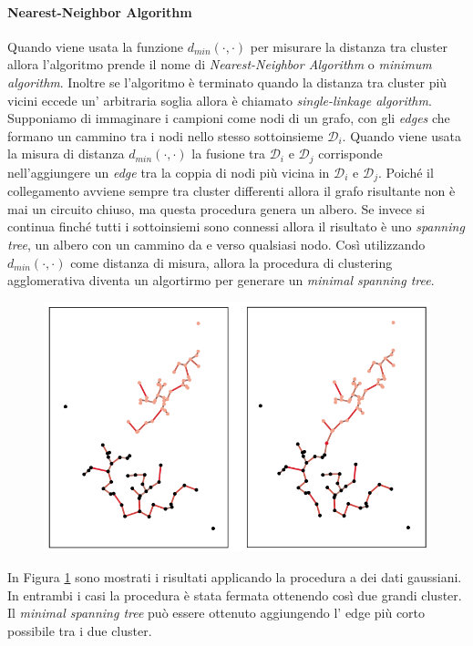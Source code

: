 \paragraph{Nearest-Neighbor Algorithm}
Quando viene usata la funzione $d_{min}(\cdot, \cdot)$ per misurare la distanza tra cluster allora l'algoritmo prende il nome di \emph{Nearest-Neighbor Algorithm} o \emph{minimum algorithm}. Inoltre se l'algoritmo è terminato quando la distanza tra  cluster più vicini eccede un' arbitraria soglia allora è chiamato \emph{single-linkage algorithm}. Supponiamo di immaginare i campioni come nodi di un grafo, con gli \emph{edges} che formano un cammino tra i nodi nello stesso sottoinsieme $\mathcal{D}_i$. Quando viene usata la misura di distanza $d_{min}(\cdot, \cdot)$ la fusione tra $	\mathcal{D}_i$ e $	\mathcal{D}_j$ corrisponde nell'aggiungere un \emph{edge} tra la coppia di nodi più vicina in  $	\mathcal{D}_i$ e $	\mathcal{D}_j$. Poiché il collegamento  avviene sempre tra cluster differenti allora il grafo risultante non è mai un circuito chiuso, ma questa procedura genera un albero. Se invece si continua finché tutti i sottoinsiemi sono connessi allora il risultato è uno \emph{spanning tree}, un albero con un cammino da e verso qualsiasi nodo. Così utilizzando $d_{min}(\cdot, \cdot)$ come distanza di misura, allora la procedura di clustering agglomerativa diventa un algortirmo per generare un \emph{minimal spanning tree}.   
\begin{figure}
\centering
\includegraphics[scale=0.5]{img/spanningtree.png}
\caption{}
\label{spanning}
\end{figure}
In Figura \ref{spanning} sono mostrati i risultati applicando la procedura a dei dati gaussiani. In entrambi i casi la procedura è stata fermata ottenendo così due grandi cluster. Il \emph{minimal spanning tree} può essere ottenuto aggiungendo  l' edge più corto possibile tra i due cluster.

